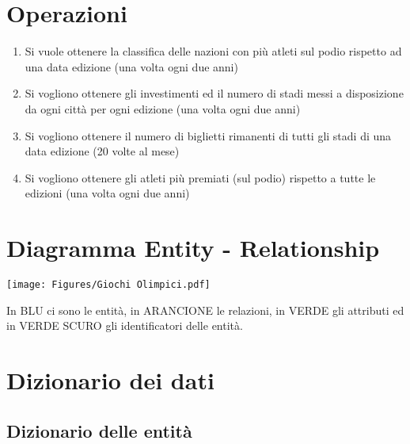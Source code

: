 \documentclass[paper=a4, fontsize=12 pt]{scrartcl} %
\begin{document}
	\newpage
	
	\section{Operazioni}
	
	\begin{enumerate}
		\item Si vuole ottenere la classifica delle nazioni con più atleti sul podio rispetto ad una data edizione (una volta ogni due anni)
		\item Si vogliono ottenere gli investimenti ed il numero di stadi messi a disposizione da ogni città per ogni edizione (una volta ogni due anni)
		\item Si vogliono ottenere il numero di biglietti rimanenti di tutti gli stadi di una data edizione (20 volte al mese)
		\item Si vogliono ottenere gli atleti più premiati (sul podio) rispetto a tutte le edizioni (una volta ogni due anni)
	\end{enumerate}
	
	
	\newpage
	
	\section{Diagramma Entity - Relationship}
	
	\texttt{[image: Figures/Giochi Olimpici.pdf]}
	
	In BLU ci sono le entità, in ARANCIONE le relazioni, in VERDE gli attributi ed in VERDE SCURO gli identificatori delle entità.
	
	
	
	\newpage
	
	\section{Dizionario dei dati}
	\subsection{Dizionario delle entità}
	
\end{document}
